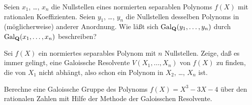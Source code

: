 \documentclass{algsheet}
\begin{document}
\begin{exercise}
    Seien \(x_1\), \dots, \(x_n\) die Nullstellen eines normierten separablen Polynoms \(f(X)\) mit
    rationalen Koeffizienten. Seien
    \(y_1\), \dots, \(y_n\) die Nullstellen desselben Polynoms in (möglicherweise) anderer Anordnung.
    Wie läßt sich \(\mathrm{Gal}_{\mathbf Q}(y_1, \dotsc, y_n)\) durch \(\mathrm{Gal}_{\mathbf Q}(x_1, \dotsc, x_n)\) beschreiben?
\end{exercise}


\begin{exercise}
    Sei \(f(X)\) ein normiertes separables Polynom mit \(n\) Nullstellen. Zeige, daß es immer gelingt, eine
    Galoissche
    Resolvente \(V(X_1, \dotsc, X_n)\) von \(f(X)\) zu finden, die von \(X_1\) nicht abhängt, also schon ein
    Polynom in \(X_2\), \dots, \(X_n\) ist.
\end{exercise}


\begin{exercise}
    Berechne eine Galoissche Gruppe des Polynoms \(f(X) = X^3 - 3 X - 4\) über den rationalen
    Zahlen mit Hilfe der Methode der Galoisschen Resolvente.
\end{exercise}
\end{document}
